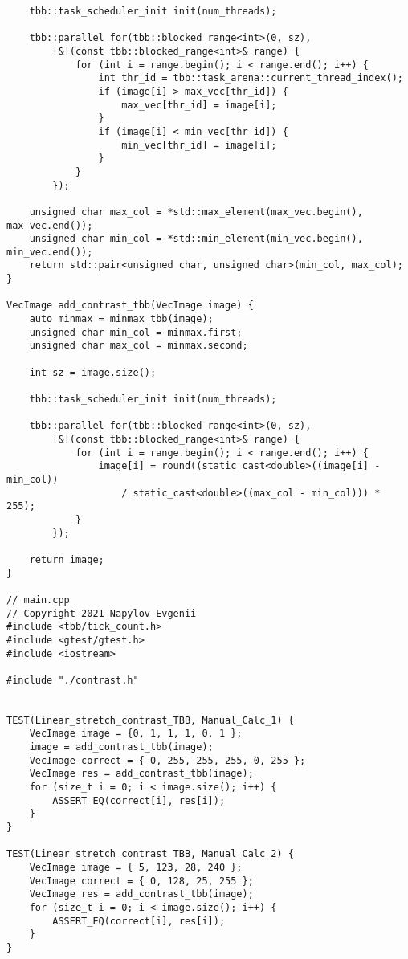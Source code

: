 \documentclass{report}
\begin{document}
\begin{lstlisting}
    tbb::task_scheduler_init init(num_threads);

    tbb::parallel_for(tbb::blocked_range<int>(0, sz),
        [&](const tbb::blocked_range<int>& range) {
            for (int i = range.begin(); i < range.end(); i++) {
                int thr_id = tbb::task_arena::current_thread_index();
                if (image[i] > max_vec[thr_id]) {
                    max_vec[thr_id] = image[i];
                }
                if (image[i] < min_vec[thr_id]) {
                    min_vec[thr_id] = image[i];
                }
            }
        });

    unsigned char max_col = *std::max_element(max_vec.begin(), max_vec.end());
    unsigned char min_col = *std::min_element(min_vec.begin(), min_vec.end());
    return std::pair<unsigned char, unsigned char>(min_col, max_col);
}

VecImage add_contrast_tbb(VecImage image) {
    auto minmax = minmax_tbb(image);
    unsigned char min_col = minmax.first;
    unsigned char max_col = minmax.second;

    int sz = image.size();

    tbb::task_scheduler_init init(num_threads);

    tbb::parallel_for(tbb::blocked_range<int>(0, sz),
        [&](const tbb::blocked_range<int>& range) {
            for (int i = range.begin(); i < range.end(); i++) {
                image[i] = round((static_cast<double>((image[i] - min_col))
                    / static_cast<double>((max_col - min_col))) * 255);
            }
        });

    return image;
}

// main.cpp
// Copyright 2021 Napylov Evgenii
#include <tbb/tick_count.h>
#include <gtest/gtest.h>
#include <iostream>

#include "./contrast.h"


TEST(Linear_stretch_contrast_TBB, Manual_Calc_1) {
    VecImage image = {0, 1, 1, 1, 0, 1 };
    image = add_contrast_tbb(image);
    VecImage correct = { 0, 255, 255, 255, 0, 255 };
    VecImage res = add_contrast_tbb(image);
    for (size_t i = 0; i < image.size(); i++) {
        ASSERT_EQ(correct[i], res[i]);
    }
}

TEST(Linear_stretch_contrast_TBB, Manual_Calc_2) {
    VecImage image = { 5, 123, 28, 240 };
    VecImage correct = { 0, 128, 25, 255 };
    VecImage res = add_contrast_tbb(image);
    for (size_t i = 0; i < image.size(); i++) {
        ASSERT_EQ(correct[i], res[i]);
    }
}


\end{lstlisting}
\end{document}
